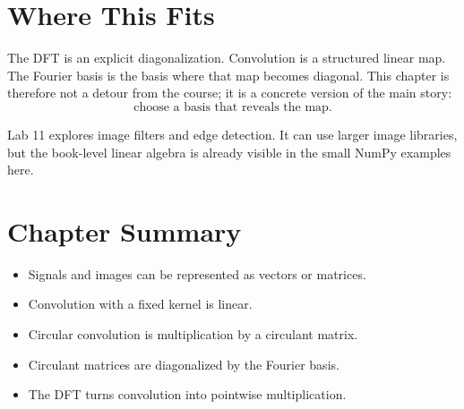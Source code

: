\section{Where This Fits}

The DFT is an explicit diagonalization. Convolution is a structured linear map.
The Fourier basis is the basis where that map becomes diagonal. This chapter is
therefore not a detour from the course; it is a concrete version of the main
story:
\[
  \text{choose a basis that reveals the map.}
\]

\begin{labbox}
Lab 11 explores image filters and edge detection. It can use larger image
libraries, but the book-level linear algebra is already visible in the small
NumPy examples here.
\end{labbox}

\section*{Chapter Summary}

\begin{itemize}
  \item Signals and images can be represented as vectors or matrices.
  \item Convolution with a fixed kernel is linear.
  \item Circular convolution is multiplication by a circulant matrix.
  \item Circulant matrices are diagonalized by the Fourier basis.
  \item The DFT turns convolution into pointwise multiplication.
\end{itemize}


